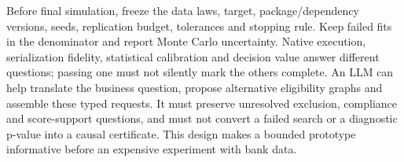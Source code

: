 Before final simulation, freeze the data laws, target, package/dependency versions,
seeds, replication budget, tolerances and stopping rule. Keep failed fits in the
denominator and report Monte Carlo uncertainty. Native execution, serialization
fidelity, statistical calibration and decision value answer different questions;
passing one must not silently mark the others complete. An LLM can help translate
the business question, propose alternative eligibility graphs and assemble these
typed requests. It must preserve unresolved exclusion, compliance and score-support
questions, and must not convert a failed search or a diagnostic p-value into a
causal certificate. This design makes a bounded prototype informative before
an expensive experiment with bank data.
